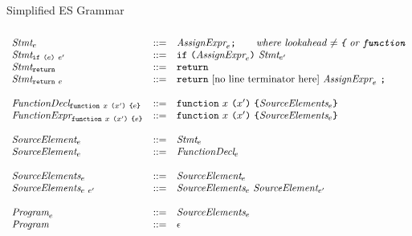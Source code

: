 \documentclass[onecolumn]{sigplanconf-onecolumn}
\begin{document}
\begin{displayfigure*}{\label{fig:grammar}Simplified ES Grammar}
\[\begin{array}{lcl}
  \\
  \textit{Stmt}_{e} &::=& 
  \textit{AssignExpr}_{e} \texttt{;}
  \qquad  \textit{where lookahead \( \not =
    \texttt{\{} \) or \( \texttt{function} \)}
  \\
  \textit{Stmt}_{\texttt{if}~\texttt{(}e\texttt{)}~e'} &::=& 
  \texttt{if}~\texttt{(}\textit{AssignExpr}_{e}\texttt{)}~\textit{Stmt}_{e'}
  \\
  \textit{Stmt}_{\texttt{return}} &::=& 
  \texttt{return}
  \\
  \textit{Stmt}_{\texttt{return}~e} &::=& 
  \texttt{return}~\textrm{[no line terminator
    here]}~\textit{AssignExpr}_{e}~\texttt{;}
  \\ \\
  \textit{FunctionDecl}_{\texttt{function}~x~\texttt{(}x'\texttt{)}~\texttt{\{}e\texttt{\}}} 
  &::=&
  \texttt{function}~x~\texttt{(}x'\texttt{)}~
  \texttt{\{}\textit{SourceElements}_{e}\texttt{\}}
  \\
  \textit{FunctionExpr}_{\texttt{function}~x~\texttt{(}x'\texttt{)}~\texttt{\{}e\texttt{\}}} 
  &::=&
  \texttt{function}~x~\texttt{(}x'\texttt{)}~
  \texttt{\{}\textit{SourceElements}_{e}\texttt{\}}
  \\ \\
  \textit{SourceElement}_{e} &::=& \textit{Stmt}_{e} 
  \\
  \textit{SourceElement}_{e} &::=& \textit{FunctionDecl}_{e}
  \\ \\

  \textit{SourceElements}_{e} &::=& \textit{SourceElement}_{e}
  \\
  \textit{SourceElements}_{e~e'} &::=& \textit{SourceElements}_{e}~\textit{SourceElement}_{e'}
  \\ \\
  \textit{Program}_{e} &::=& \textit{SourceElements}_{e}
  \\
  \textit{Program}_{} &::=& \epsilon
\end{array}
\]  
\end{displayfigure*}
\end{document}
